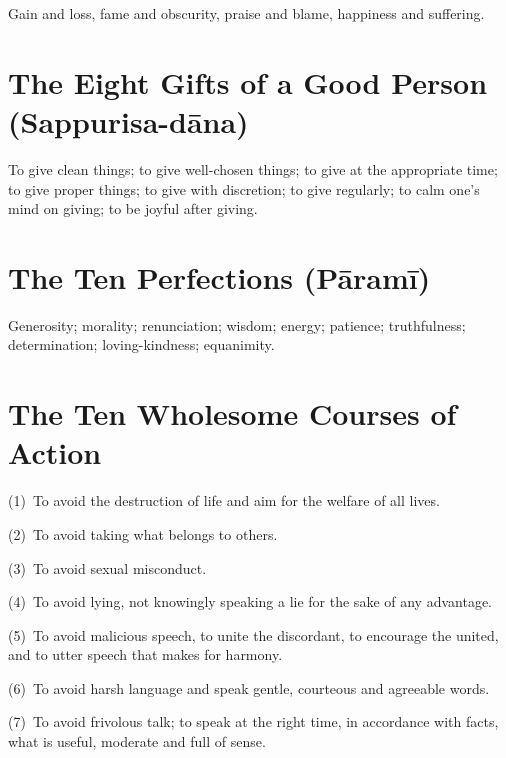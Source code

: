 Gain and loss, fame and obscurity, praise and blame, happiness and suffering.


\ifhandbookedition
\vspace*{-\baselineskip}
\fi

\section*{The Eight Gifts of a Good Person (Sappurisa-dāna)}

To give clean things; to give well-chosen things; to give at the appropriate
time; to give proper things; to give with discretion; to give regularly; to calm
one's mind on giving; to be joyful after giving.


\ifhandbookedition
\vspace*{-\baselineskip}
\fi

\section*{The Ten Perfections (Pāramī)}

Generosity; morality; renunciation; wisdom; energy; patience; truthfulness;
determination; loving-kindness; equanimity.


\ifhandbookedition
\vspace*{-\baselineskip}
\fi

\section*{The Ten Wholesome Courses of Action}

(1)~To avoid the destruction of life and aim for the welfare of all lives.

(2)~To avoid taking what belongs to others.

(3)~To avoid sexual misconduct.

(4)~To avoid lying, not knowingly speaking a lie for the sake of any advantage.

(5)~To avoid malicious speech, to unite the discordant, to encourage the united, and
to utter speech that makes for harmony.

(6)~To avoid harsh language and speak gentle, courteous and agreeable words.

(7)~To avoid frivolous talk; to speak at the right time, in accordance with facts,
what is useful, moderate and full of sense.

